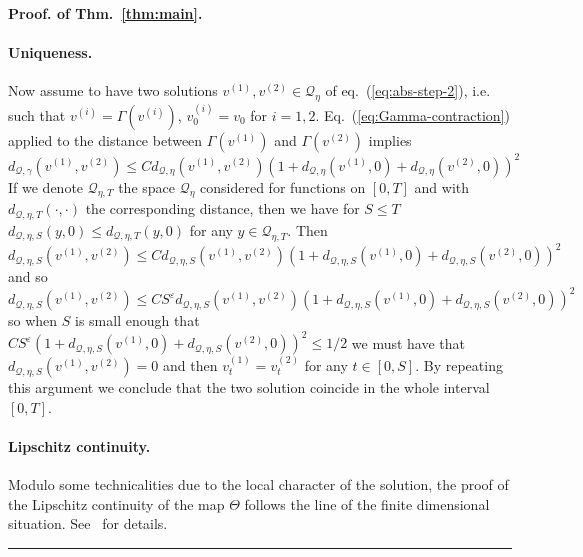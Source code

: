 \documentclass[a4paper,11pt,reqno]{article}
\newcommand{\eps}{\varepsilon}
\newcommand{\QQ}{\mathcal{Q}}
\newenvironment{proof}[1][Proof]{\textbf{#1.} }{\ \rule{0.5em}{0.5em}}
\begin{document}
\begin{proof}[Proof. of Thm.~\ref{thm:main}]
\paragraph{Uniqueness.} Now assume to have two solutions 
$v^{(1)},v^{(2)} \in \QQ_\eta$ of eq.~(\ref{eq:abs-step-2}), i.e. such
that $v^{(i)} = \Gamma(v^{(i)})$, $v^{(i)}_0 = v_0$ for
$i=1,2$. Eq.~(\ref{eq:Gamma-contraction}) applied to the distance between $\Gamma(v^{(1)})
$ and $\Gamma(v^{(2)})$ implies
\begin{equation*}
 d_{\QQ,\gamma}(v^{(1)},v^{(2)}) \le C  d_{\QQ,\eta}(v^{(1)},v^{(2)}) (1+ d_{\QQ,\eta}(v^{(1)},0)+ d_{\QQ,\eta}(v^{(2)},0))^2   
\end{equation*}
If we denote $\QQ_{\eta,T}$ the space $\QQ_{\eta}$ considered for
functions on $[0,T]$ and with $ d_{\QQ,\eta,T}(\cdot,\cdot)$ the
corresponding distance, then we have for $S \le T$
$
 d_{\QQ,\eta,S}(y,0) \le   d_{\QQ,\eta,T}(y,0)
$ for any $y \in \QQ_{\eta,T}$. Then
\begin{equation*}
 d_{\QQ,\eta,S}(v^{(1)},v^{(2)}) \le C  d_{\QQ,\eta,S}(v^{(1)},v^{(2)}) (1+ d_{\QQ,\eta,S}(v^{(1)},0)+ d_{\QQ,\eta,S}(v^{(2)},0))^2   
\end{equation*}
and so
\begin{equation*}
 d_{\QQ,\eta,S}(v^{(1)},v^{(2)}) \le C S^\eps  d_{\QQ,\eta,S}(v^{(1)},v^{(2)}) (1+ d_{\QQ,\eta,S}(v^{(1)},0)+ d_{\QQ,\eta,S}(v^{(2)},0))^2   
\end{equation*}
so when $S$ is small enough that $C S^\eps
(1+ d_{\QQ,\eta,S}(v^{(1)},0)+ d_{\QQ,\eta,S}(v^{(2)},0))^2  \le 1/2  $ we
must have that $ d_{\QQ,\eta,S}(v^{(1)},v^{(2)}) = 0$ and then
$v^{(1)}_t = v^{(2)}_t$ for any $t \in [0,S]$. By repeating this
argument  we conclude that the two solution coincide in the whole interval
$[0,T]$.

\paragraph{Lipschitz continuity.}
Modulo some technicalities due to the local character of the solution, the proof of the Lipschitz continuity of the map $\Theta$ follows the line of the finite dimensional situation. See~\cite{MR2091358} for details.
\end{proof}

%
%
\end{document}
